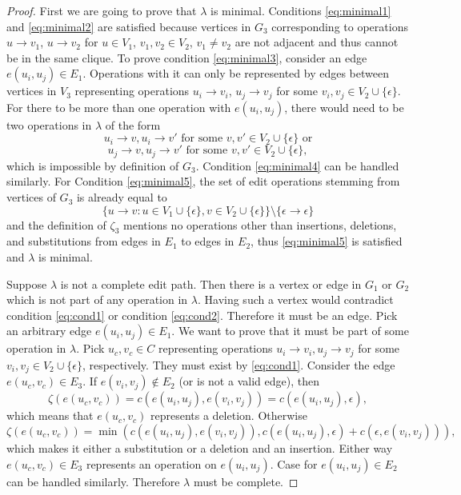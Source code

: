 \documentclass{article}
\theoremstyle{definition}
\begin{document}
\begin{proof}
  First we are going to prove that $\lambda$ is minimal. Conditions \eqref{eq:minimal1} and \eqref{eq:minimal2} are satisfied because vertices in $G_3$ corresponding to operations $u \to v_1$, $u \to v_2$ for $u \in V_1$, $v_1, v_2 \in V_2$, $v_1 \ne v_2$ are not adjacent and thus cannot be in the same clique. To prove condition \eqref{eq:minimal3}, consider an edge $e(u_i, u_j) \in E_1$. Operations with it can only be represented by edges between vertices in $V_3$ representing operations $u_i \to v_i$, $u_j \to v_j$ for some $v_i, v_j \in V_2 \cup \{ \epsilon \}$. For there to be more than one operation with $e(u_i, u_j)$, there would need to be two operations in $\lambda$ of the form
  \[ u_i \to v, u_i \to v' \text{ for some } v, v' \in V_2 \cup \{ \epsilon \} \text{ or} \]
  \[ u_j \to v, u_j \to v' \text{ for some } v, v' \in V_2 \cup \{ \epsilon \}, \]
  which is impossible by definition of $G_3$. Condition \eqref{eq:minimal4} can be handled similarly. For Condition \eqref{eq:minimal5}, the set of edit operations stemming from vertices of $G_3$ is already equal to
  \[ \{ u \to v: u \in V_1 \cup \{ \epsilon \}, v \in V_2 \cup \{ \epsilon \} \} \setminus \{ \epsilon \to \epsilon \} \]
  and the definition of $\zeta_3$ mentions no operations other than insertions, deletions, and substitutions from edges in $E_1$ to edges in $E_2$, thus \eqref{eq:minimal5} is satisfied and $\lambda$ is minimal.

  Suppose $\lambda$ is not a complete edit path. Then there is a vertex or edge in $G_1$ or $G_2$ which is not part of any operation in $\lambda$. Having such a vertex would contradict condition \eqref{eq:cond1} or condition \eqref{eq:cond2}. Therefore it must be an edge. Pick an arbitrary edge $e(u_i, u_j) \in E_1$. We want to prove that it must be part of some operation in $\lambda$. Pick $u_c, v_c \in C$ representing operations $u_i \to v_i, u_j \to v_j$ for some $v_i, v_j \in V_2 \cup \{ \epsilon \}$, respectively. They must exist by \eqref{eq:cond1}. Consider the edge $e(u_c, v_c) \in E_3$. If $e(v_i, v_j) \not \in E_2$ (or is not a valid edge), then
  \[ \zeta(e(u_c, v_c)) = c(e(u_i, u_j), e(v_i, v_j)) = c(e(u_i, u_j), \epsilon), \]
  which means that $e(u_c, v_c)$ represents a deletion. Otherwise
  \[ \zeta(e(u_c, v_c)) = \min(c(e(u_i, u_j), e(v_i, v_j)), c(e(u_i, u_j), \epsilon) + c(\epsilon, e(v_i, v_j))), \]
  which makes it either a substitution or a deletion and an insertion. Either way $e(u_c, v_c) \in E_3$ represents an operation on $e(u_i, u_j)$. Case for $e(u_i, u_j) \in E_2$ can be handled similarly. Therefore $\lambda$ must be complete.


\end{proof}
\end{document}
